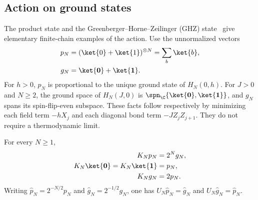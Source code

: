 \subsection{Action on ground states}%
\label{sec:asymex_kw_action}

The product state and the Greenberger--Horne--Zeilinger (GHZ)
state~\cite{GreenbergerHorneZeilinger1989,Greenberger1990Bell} give
elementary finite-chain examples of the action. Use the unnormalized
vectors
\begin{align}
    p_N & =(\ket{0}+\ket{1})^{\otimes N}=\sum_b\ket{b},
    \notag                                              \\
    g_N & =\ket{\mathbf0}+\ket{\mathbf1}.
    \label{eq:asymex_kw_states}
\end{align}
For $h>0$, $p_N$ is proportional to the unique ground state of
$H_N(0,h)$. For $J>0$ and $N\geq2$, the ground space of $H_N(J,0)$ is
$\spn_{\C}\{\ket{\mathbf0},\ket{\mathbf1}\}$, and $g_N$ spans its
spin-flip-even subspace. These facts follow respectively by minimizing
each field term $-hX_j$ and each diagonal bond term $-JZ_jZ_{j+1}$.
They do not require a thermodynamic limit.

\begin{lemma}
    \label{lem:asymex_kw_states}
    \leanok
    For every $N\geq1$,
    \begin{align}
        K_Np_N                              & =2^Ng_N,
        \notag                                         \\
        K_N\ket{\mathbf0}=K_N\ket{\mathbf1} & =p_N,
        \notag                                         \\
        K_Ng_N                              & =2p_N.
        \label{eq:asymex_kw_state_actions}
    \end{align}
    Writing $\widehat p_N=2^{-N/2}p_N$ and
    $\widehat g_N=2^{-1/2}g_N$, one has
    $U_N\widehat p_N=\widehat g_N$ and
    $U_N\widehat g_N=\widehat p_N$.
\end{lemma}

